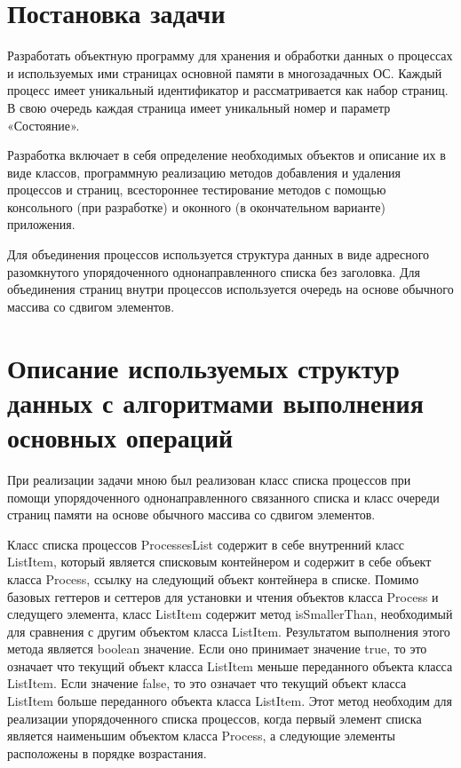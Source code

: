 \documentclass[russian,utf8,simple,hpadding=10mm,vpadding=20mm]{eskdtext}
\begin{document}
\maketitle
\newpage

\sloppy

\linespread{1,5}
\tableofcontents

\newpage
\parindent=12.5mm
\linespread{2}
\section{Постановка задачи}

Разработать объектную программу для хранения и обработки данных о процессах и используемых ими страницах основной памяти в многозадачных ОС. Каждый процесс имеет уникальный идентификатор и рассматривается как набор страниц. В свою очередь каждая страница имеет уникальный номер и параметр «Состояние».

Разработка включает в себя определение необходимых объектов и описание их в виде классов, программную реализацию методов добавления и удаления процессов и страниц, всестороннее тестирование методов с помощью консольного (при разработке) и оконного (в окончательном варианте) приложения.

Для объединения процессов используется структура данных в виде адресного разомкнутого упорядоченного однонаправленного списка без заголовка. Для объединения страниц внутри процессов  используется очередь на основе обычного массива со сдвигом элементов.


\newpage
\parindent=15mm
\doublespacing
\section{Описание используемых структур данных с алгоритмами выполнения основных операций}

При реализации задачи мною был реализован класс списка процессов при помощи упорядоченного однонаправленного связанного списка и класс очереди страниц памяти на основе обычного массива со сдвигом элементов.

Класс списка процессов ProcessesList содержит в себе внутренний класс ListItem, который является списковым контейнером и содержит в себе объект класса Process, ссылку на следующий объект контейнера в списке. Помимо базовых геттеров и сеттеров для установки и чтения объектов класса Process и следущего элемента, класс ListItem содержит метод isSmallerThan, необходимый для сравнения с другим объектом класса ListItem. Результатом выполнения этого метода является boolean значение. Если оно принимает значение true, то это означает что текущий объект класса ListItem меньше переданного объекта класса ListItem. Если значение false, то это означает что текущий объект класса ListItem больше переданного объекта класса ListItem. Этот метод необходим для реализации упорядоченного списка процессов, когда первый элемент списка является наименьшим объектом класса Process, а следующие элементы расположены в порядке возрастания.
\end{document}
